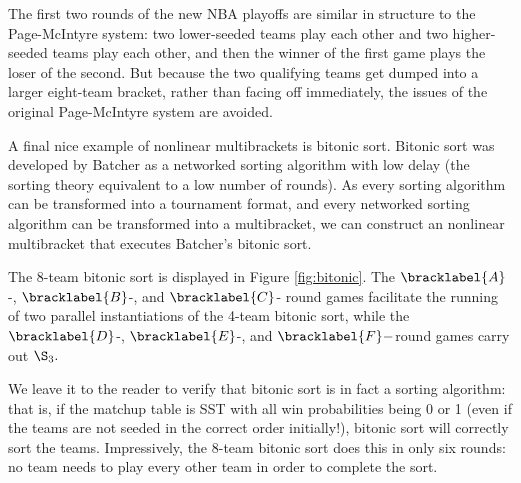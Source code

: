 {    

    The first two rounds of the new NBA playoffs are similar in structure to the Page-McIntyre system: two lower-seeded teams play each other and two higher-seeded teams play each other, and then the winner of the first game plays the loser of the second. But because the two qualifying teams get dumped into a larger eight-team bracket, rather than facing off immediately, the issues of the original Page-McIntyre system are avoided.

    A final nice example of nonlinear multibrackets is bitonic sort. Bitonic sort was developed by Batcher \cite{batcher} as a networked sorting algorithm with low delay (the sorting theory equivalent to a low number of rounds). As every sorting algorithm can be transformed into a tournament format, and every networked sorting algorithm can be transformed into a multibracket, we can construct an nonlinear multibracket that executes Batcher's bitonic sort.


    The 8-team bitonic sort is displayed in Figure \ref{fig:bitonic}. The $\bracklabel{A}$-, $\bracklabel{B}$-, and $\bracklabel{C}$- round games facilitate the running of two parallel instantiations of the 4-team bitonic sort, while the $\bracklabel{D}$-, $\bracklabel{E}$-, and $\bracklabel{F}-$round games carry out $\S_3.$


    We leave it to the reader to verify that bitonic sort is in fact a sorting algorithm: that is, if the matchup table is SST with all win probabilities being 0 or 1 (even if the teams are not seeded in the correct order initially!), bitonic sort will correctly sort the teams. Impressively, the 8-team bitonic sort does this in only six rounds: no team needs to play every other team in order to complete the sort.
}